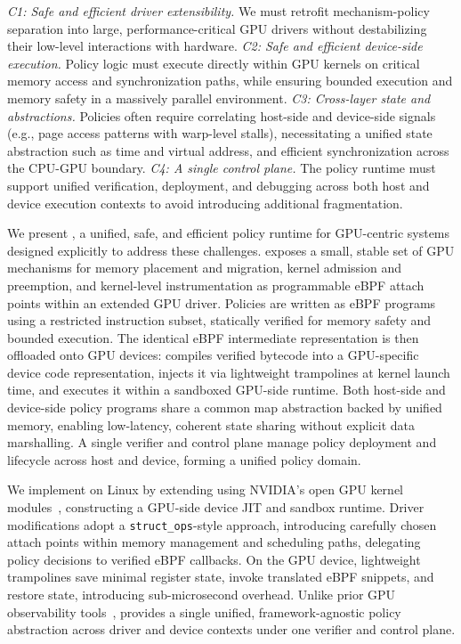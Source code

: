 \emph{C1: Safe and efficient driver extensibility.} We must retrofit mechanism-policy separation into large, performance-critical GPU drivers without destabilizing their low-level interactions with hardware. \emph{C2: Safe and efficient device-side execution.} Policy logic must execute directly within GPU kernels on critical memory access and synchronization paths, while ensuring bounded execution and memory safety in a massively parallel environment. \emph{C3: Cross-layer state and abstractions.} Policies often require correlating host-side and device-side signals (e.g., page access patterns with warp-level stalls), necessitating a unified state abstraction such as time and virtual address, and efficient synchronization across the CPU-GPU boundary. \emph{C4: A single control plane.} The policy runtime must support unified verification, deployment, and debugging across both host and device execution contexts to avoid introducing additional fragmentation.

We present \sys, a unified, safe, and efficient policy runtime for GPU-centric systems designed explicitly to address these challenges. \sys exposes a small, stable set of GPU mechanisms for memory placement and migration, kernel admission and preemption, and kernel-level instrumentation as programmable eBPF attach points within an extended GPU driver. Policies are written as eBPF programs using a restricted instruction subset, statically verified for memory safety and bounded execution. The identical eBPF intermediate representation is then offloaded onto GPU devices: \sys compiles verified bytecode into a GPU-specific device code representation, injects it via lightweight trampolines at kernel launch time, and executes it within a sandboxed GPU-side runtime. Both host-side and device-side policy programs share a common map abstraction backed by unified memory, enabling low-latency, coherent state sharing without explicit data marshalling. A single verifier and control plane manage policy deployment and lifecycle across host and device, forming a unified policy domain.

We implement \sys on Linux by extending \sysdriver using NVIDIA's open GPU kernel modules~\cite{}, constructing a GPU-side device JIT and sandbox runtime. Driver modifications adopt a \texttt{struct\_ops}-style approach, introducing carefully chosen attach points within memory management and scheduling paths, delegating policy decisions to verified eBPF callbacks. On the GPU device, lightweight trampolines save minimal register state, invoke translated eBPF snippets, and restore state, introducing sub-microsecond overhead. Unlike prior GPU observability tools~\cite{cupti,villa2019nvbit,neutrino,egpu}, \sys provides a single unified, framework-agnostic policy abstraction across driver and device contexts under one verifier and control plane.

